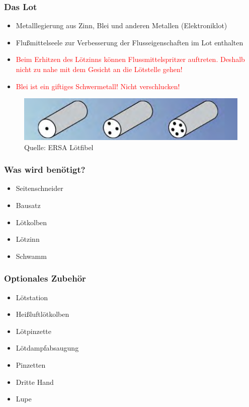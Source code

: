 \documentclass[10pt]{beamer}
\begin{document}
	\begin{frame}
	\frametitle{Das Lot}
	\begin{itemize}
		\item{Metalllegierung aus Zinn, Blei und anderen Metallen (Elektroniklot)}
		\item{Flußmittelseele zur Verbesserung der Flusseigenschaften im Lot enthalten}
		\item{\textcolor{red}{Beim Erhitzen des Lötzinns können Flussmittelspritzer auftreten. Deshalb nicht zu nahe mit dem Gesicht an die Lötstelle gehen!}}
		\item{\textcolor{red}{Blei ist ein giftiges Schwermetall! Nicht verschlucken!}}
	\end{itemize}
	\begin{figure}[hbtp]
		\centering
		\includegraphics[width=\linewidth]{images/lotseele.png}
		\caption{Quelle: ERSA Lötfibel}
	\end{figure}
	\end{frame}

	\begin{frame}
	\frametitle{Was wird benötigt?}
	\begin{itemize}
		\item{Seitenschneider}
		\item{Bausatz}
		\item{Lötkolben}
		\item{Lötzinn}
		\item{Schwamm}
	\end{itemize}
	\end{frame}

	\begin{frame}
	\frametitle{Optionales Zubehör}
	\begin{itemize}
		\item{Lötstation}
		\item{Heißluftlötkolben}
		\item{Lötpinzette}
		
		\item{Lötdampfabsaugung}
		
		\item{Pinzetten}
		\item{Dritte Hand}
		\item{Lupe}
	\end{itemize}
	\end{frame}
\end{document}
